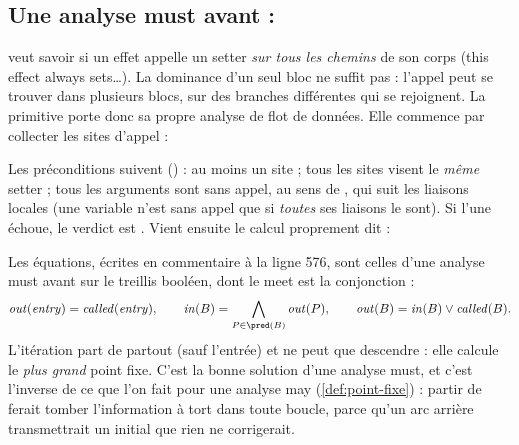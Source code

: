 \subsection{Une analyse must avant : }
\label{sec:api-regles-must-setter}

 veut savoir si un effet appelle un setter \emph{sur tous les chemins} de son corps (\og this effect always sets\ldots\fg). La dominance d'un seul bloc ne suffit pas : l'appel peut se trouver dans plusieurs blocs, sur des branches différentes qui se rejoignent. La primitive porte donc sa propre analyse de flot de données. Elle commence par collecter les sites d'appel :


Les préconditions suivent () : au moins un site ; tous les sites visent le \emph{même} setter ; tous les arguments sont sans appel, au sens de , qui suit les liaisons locales (une variable n'est \og sans appel\fg{} que si \emph{toutes} ses liaisons le sont). Si l'une échoue, le verdict est . Vient ensuite le calcul proprement dit :


Les équations, écrites en commentaire à la ligne 576, sont celles d'une analyse must avant sur le treillis booléen, dont le meet est la conjonction :
\[
\mathit{out}(\mathit{entry}) = \mathit{called}(\mathit{entry}),\qquad
\mathit{in}(B) = \bigwedge_{P \in \pred(B)} \mathit{out}(P),\qquad
\mathit{out}(B) = \mathit{in}(B) \vee \mathit{called}(B).
\]
L'itération part de  partout (sauf l'entrée) et ne peut que descendre : elle calcule le \emph{plus grand} point fixe. C'est la bonne solution d'une analyse must, et c'est l'inverse de ce que l'on fait pour une analyse may (\cref{def:point-fixe}) : partir de  ferait tomber l'information à tort dans toute boucle, parce qu'un arc arrière transmettrait un  initial que rien ne corrigerait.

